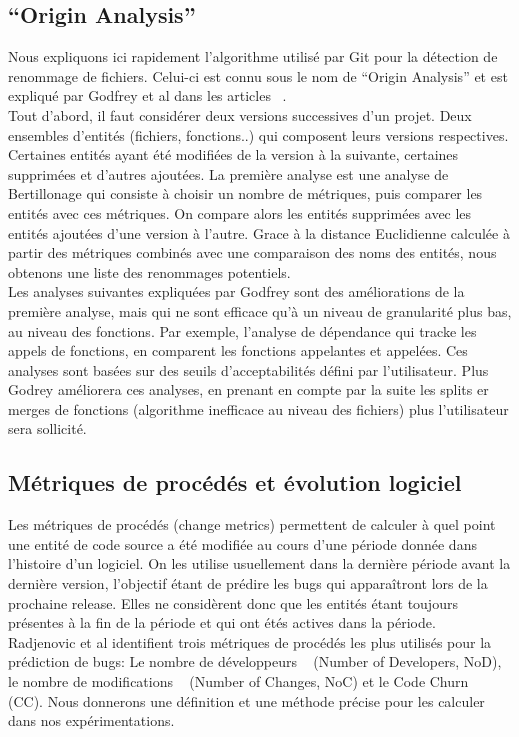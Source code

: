 \subsection{``Origin Analysis''}
Nous expliquons ici rapidement l'algorithme utilisé par Git pour la détection de renommage de fichiers. Celui-ci est connu sous le nom de ``Origin Analysis'' et est expliqué par Godfrey et al dans les articles ~\cite{tu_integrated_2002,godfrey_tracking_2002,godfrey_using_2005}.\\
Tout d'abord, il faut considérer deux versions successives d'un projet. Deux ensembles d'entités (fichiers, fonctions..) qui composent leurs versions respectives. Certaines entités ayant été modifiées de la version à la suivante, certaines supprimées et d'autres ajoutées.
La première analyse est une analyse de Bertillonage qui consiste à choisir un nombre de métriques, puis comparer les entités avec ces métriques. On compare alors les entités supprimées avec les entités ajoutées d'une version à l'autre. Grace à la distance Euclidienne calculée à partir des métriques combinés avec une comparaison des noms des entités, nous obtenons une liste des renommages potentiels.\\
Les analyses suivantes expliquées par Godfrey sont des améliorations de la première analyse, mais qui ne sont efficace qu'à un niveau de granularité plus bas, au niveau des fonctions. Par exemple, l'analyse de dépendance qui tracke les appels de fonctions, en comparent les fonctions appelantes et appelées. Ces analyses sont basées sur des seuils d'acceptabilités défini par l'utilisateur. Plus Godrey améliorera ces analyses, en prenant en compte par la suite les splits er merges de fonctions (algorithme inefficace au niveau des fichiers) plus l'utilisateur sera sollicité. \\

\subsection{Métriques de procédés et évolution logiciel}
Les métriques de procédés (change metrics) permettent de calculer à quel point une entité de code source a été modifiée au cours d'une période donnée dans l'histoire d'un logiciel. On les utilise usuellement dans la dernière période avant la dernière version, l'objectif étant de prédire les bugs qui apparaîtront lors de la prochaine release. Elles ne considèrent donc que les entités étant toujours présentes à la fin de la période et qui ont étés actives dans la période.\\
Radjenovic et al \cite{radjenovic_software_2013} identifient trois métriques de procédés les plus utilisés pour la prédiction de bugs: Le nombre de développeurs ~\cite{weyuker_too_2008} (Number of Developers, NoD), le nombre de modifications ~\cite{graves_predicting_2000} (Number of Changes, NoC) et le Code Churn ~\cite{munson_code_1998} (CC). Nous donnerons une définition et une méthode précise pour les calculer dans nos expérimentations.\\

